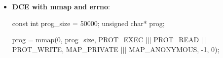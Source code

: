 \documentclass{report}
\begin{document}
\begin{itemize}
            \begin{itemize}
                \item \textbf{ENOMEM}:	Insufficient memory or address space
                \item \textbf{EACCES}:	Permission denied (e.g., PROT\_EXEC disallowed)
                \item \textbf{EINVAL}:	Invalid flags, alignment, or parameters
                \item \textbf{EBADF}:	Invalid file descriptor
                \item \textbf{ENODEV}:	Unsupported mapping type
            \end{itemize}
            To convert errno to text, use perror or strerror
            \bigbreak \noindent 
            \begin{cppcode}
                perror(const char*)
                strerror(errno)
            \end{cppcode}
            \bigbreak \noindent 
            perror prints a textual description of the error code currently stored in the system variable errno to stderr. It's parameter is a pointer to a null-terminated string with explanatory message
        \item \textbf{DCE with mmap and errno}: 
            \bigbreak \noindent 
            \begin{cppcode}
const int prog_size = 50000;
unsigned char* prog;

prog = mmap(0, prog_size, PROT_EXEC |$\mid$| PROT_READ |$\mid$| PROT_WRITE, MAP_PRIVATE |$\mid$| MAP_ANONYMOUS, -1, 0);


\end{cppcode}
\end{itemize}
\end{document}
